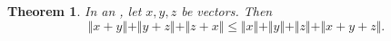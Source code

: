 \documentclass[12pt]{article}
\begin{document}
\newtheorem{thm}{Theorem} 
\begin{thm} In an , let $x,y,z$ be vectors. Then
$$
\Vert x + y \Vert + \Vert y + z \Vert+ \Vert z + x \Vert \le \Vert x \Vert + \Vert y \Vert  + \Vert z \Vert + \Vert x + y + z \Vert .$$
\end{thm}
\end{document}

